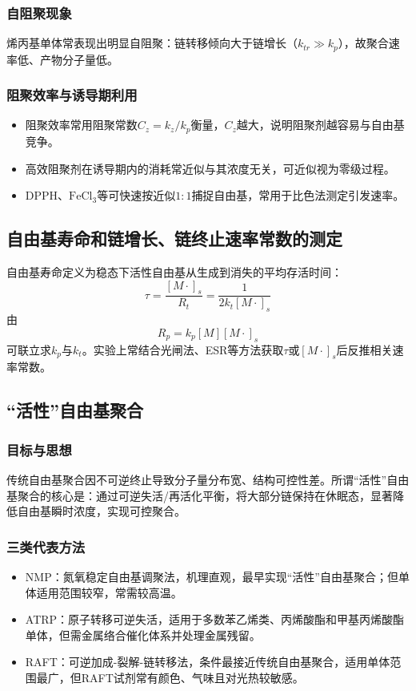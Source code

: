 ﻿\documentclass[12pt,a4paper]{article}
\begin{document}
\subsubsection{自阻聚现象}
烯丙基单体常表现出明显自阻聚：链转移倾向大于链增长（$k_{tr}\gg k_p$），故聚合速率低、产物分子量低。

\subsubsection{阻聚效率与诱导期利用}
\begin{itemize}
  \item 阻聚效率常用阻聚常数$C_z=k_z/k_p$衡量，$C_z$越大，说明阻聚剂越容易与自由基竞争。
  \item 高效阻聚剂在诱导期内的消耗常近似与其浓度无关，可近似视为零级过程。
  \item DPPH、$\mathrm{FeCl_3}$等可快速按近似$1{:}1$捕捉自由基，常用于比色法测定引发速率。
\end{itemize}

\subsection{自由基寿命和链增长、链终止速率常数的测定}
自由基寿命定义为稳态下活性自由基从生成到消失的平均存活时间：
\[
\tau=\frac{[M\cdot]_s}{R_t}=\frac{1}{2k_t[M\cdot]_s}
\]
由
\[
R_p=k_p[M][M\cdot]_s
\]
可联立求$k_p$与$k_t$。实验上常结合光闸法、ESR等方法获取$\tau$或$[M\cdot]_s$后反推相关速率常数。

\subsection{“活性”自由基聚合}
\subsubsection{目标与思想}
传统自由基聚合因不可逆终止导致分子量分布宽、结构可控性差。所谓“活性”自由基聚合的核心是：通过可逆失活/再活化平衡，将大部分链保持在休眠态，显著降低自由基瞬时浓度，实现可控聚合。

\subsubsection{三类代表方法}
\begin{itemize}
  \item NMP：氮氧稳定自由基调聚法，机理直观，最早实现“活性”自由基聚合；但单体适用范围较窄，常需较高温。
  \item ATRP：原子转移可逆失活，适用于多数苯乙烯类、丙烯酸酯和甲基丙烯酸酯单体，但需金属络合催化体系并处理金属残留。
  \item RAFT：可逆加成-裂解-链转移法，条件最接近传统自由基聚合，适用单体范围最广，但RAFT试剂常有颜色、气味且对光热较敏感。
\end{itemize}
\end{document}
